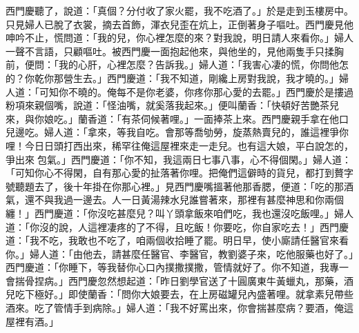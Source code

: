 西門慶聽了，說道：「真個？分付收了家火罷，我不吃酒了。」於是走到玉樓房中。只見婦人已脫了衣裳，摘去首飾，渾衣兒歪在炕上，正倒著身子嘔吐。西門慶見他呻吟不止，慌問道：「我的兒，你心裡怎麼的來？對我說，明日請人來看你。」婦人一聲不言語，只顧嘔吐。被西門慶一面抱起他來，與他坐的，見他兩隻手只揉胸前，便問：「我的心肝，心裡怎麼？告訴我。」婦人道：「我害心凄的慌，你問他怎的？你乾你那營生去。」西門慶道：「我不知道，剛纔上房對我說，我才曉的。」婦人道：「可知你不曉的。俺每不是你老婆，你疼你那心愛的去罷。」西門慶於是摟過粉項來親個嘴，說道：「怪油嘴，就奚落我起來。」便叫蘭香：「快頓好苦艷茶兒來，與你娘吃。」蘭香道：「有茶伺候著哩。」一面捧茶上來。西門慶親手拿在他口兒邊吃。婦人道：「拿來，等我自吃。會那等喬劬勞，旋蒸熱賣兒的，誰這裡爭你哩！今日日頭打西出來，稀罕往俺這屋裡來走一走兒。也有這大娘，平白說怎的，爭出來𤈸包氣。」西門慶道：「你不知，我這兩日七事八事，心不得個閑。」婦人道：「可知你心不得閑，自有那心愛的扯落著你哩。把俺們這僻時的貨兒，都打到贅字號聽題去了，後十年掛在你那心裡。」見西門慶嘴搵著他那香腮，便道：「吃的那酒氣，還不與我過一邊去。人一日黃湯辣水兒誰嘗著來，那裡有甚麼神思和你兩個纏！」西門慶道：「你沒吃甚麼兒？叫丫頭拿飯來咱們吃，我也還沒吃飯哩。」婦人道：「你沒的說，人這裡凄疼的了不得，且吃飯！你要吃，你自家吃去！」西門慶道：「我不吃，我敢也不吃了，咱兩個收拾睡了罷。明日早，使小廝請任醫官來看你。」婦人道：「由他去，請甚麼任醫官、李醫官，教劉婆子來，吃他服藥也好了。」西門慶道：「你睡下，等我替你心口內撲撒撲撒，管情就好了。你不知道，我專一會揣骨捏病。」西門慶忽然想起道：「昨日劉學官送了十圓廣東牛黃蠟丸，那藥，酒兒吃下極好。」即使蘭香：「問你大娘要去，在上房磁罐兒內盛著哩。就拿素兒帶些酒來。吃了管情手到病除。」婦人道：「我不好罵出來，你會揣甚麼病？要酒，俺這屋裡有酒。」

